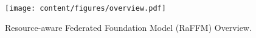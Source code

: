 \begin{figure}
  \vspace{-20px}
  \centering
  \texttt{[image: content/figures/overview.pdf]}
    \vspace{-15px}

  \caption{Resource-aware Federated Foundation Model (RaFFM) Overview.}
  \label{fig:overview}
  \vspace{-10px}
\end{figure}
